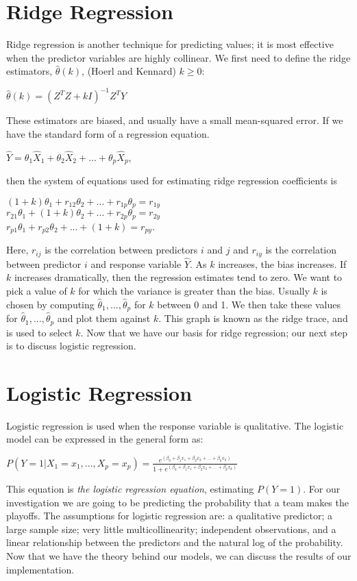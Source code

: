\section*{Ridge Regression}
Ridge regression is another technique for predicting values; it is most effective when the predictor variables are highly collinear. We first need to define the ridge estimators, $\hat{\theta}(k)$, (Hoerl and Kennard\cite{Samprit}) $k \geq 0$:\begin{center}$
\hat{\theta}(k) = (Z^TZ + kI)^{-1}Z^TY 
$\end{center} These estimators are biased, and usually have a small mean-squared error. If we have the standard form of a regression equation.
\begin{center}$
\hat{Y}	= \theta_1\hat{X}_1 + \theta_2\hat{X}_2 + ... + \theta_p\hat{X}_p
$,\end{center}
then the system of equations used for estimating ridge regression coefficients is
\begin{center}
	$(1+k)\theta_1 + r_{12}\theta_2 + ... + r_{1p}\theta_p = r_{1y}$ \\
	$r_{21}\theta_1 + (1+k)\theta_2 + ... + r_{2p}\theta_p = r_{2y}$ \\
	$r_{p1}\theta_1 + r_{p2}\theta_2 + ... + (1+k) = r_{py}$.
\end{center}
Here, $r_{ij}$ is the correlation between predictors $i$ and $j$ and $r_{iy}$ is the correlation between predictor $i$ and response variable $\hat{Y}$. As $k$ increases, the bias increases. If $k$ increases dramatically, then the regression estimates tend to zero. We want to pick a value of $k$ for which the variance is greater than the bias. Usually $k$ is chosen by computing $\hat{\theta}_1,...,\hat{\theta}_p$ for $k$ between 0 and 1. We then take these values for $\hat{\theta}_1,...,\hat{\theta}_p$ and plot them against $k$. This graph is known as the ridge trace, and is used to select $k$. Now that we have our basis for ridge regression; our next step is to discuss logistic regression.
\section*{Logistic Regression}
Logistic regression is used when the response variable is qualitative. The logistic model can be expressed in the general form as: \begin{center}$
P(Y=1|X_1 = x_1, ..., X_p = x_p) = \frac{e^{(\beta_0 + \beta_1x_1 + \beta_2x_2 + ... + \beta_kx_k)}}{1 + e^{(\beta_0 + \beta_1x_1 + \beta_2x_2 + ... + \beta_kx_k)}}
$\end{center}
This equation is \textit{the logistic regression equation}, estimating $P(Y=1)$. For our investigation we are going to be predicting the probability that a team makes the playoffs. The assumptions for logistic regression are: a qualitative predictor; a large sample size; very little multicollinearity; independent observations, and a linear relationship between the predictors and the natural log of the probability. Now that we have the theory behind our models, we can discuss the results of our implementation.